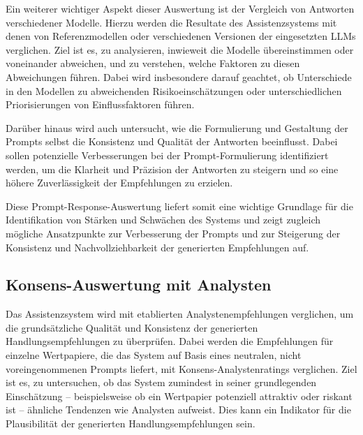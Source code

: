       Ein weiterer wichtiger Aspekt dieser Auswertung ist der Vergleich von Antworten verschiedener Modelle.
      Hierzu werden die Resultate des Assistenzsystems mit denen von Referenzmodellen oder verschiedenen Versionen der eingesetzten \acs{LLM}s verglichen.
      Ziel ist es, zu analysieren, inwieweit die Modelle übereinstimmen oder voneinander abweichen, und zu verstehen, welche Faktoren zu diesen Abweichungen führen.
      Dabei wird insbesondere darauf geachtet, ob Unterschiede in den Modellen zu abweichenden Risikoeinschätzungen oder unterschiedlichen Priorisierungen von Einflussfaktoren führen.

      Darüber hinaus wird auch untersucht, wie die Formulierung und Gestaltung der Prompts selbst die Konsistenz und Qualität der Antworten beeinflusst.
      Dabei sollen potenzielle Verbesserungen bei der Prompt-Formulierung identifiziert werden, um die Klarheit und Präzision der Antworten zu steigern und so eine höhere Zuverlässigkeit der Empfehlungen zu erzielen.

      Diese Prompt-Response-Auswertung liefert somit eine wichtige Grundlage für die Identifikation von Stärken und Schwächen des Systems und zeigt zugleich mögliche Ansatzpunkte zur Verbesserung der Prompts und zur Steigerung der Konsistenz und Nachvollziehbarkeit der generierten Empfehlungen auf.



    \subsection{Konsens-Auswertung mit Analysten}
      \label{sec:analyst-konsens}

      Das Assistenzsystem wird mit etablierten Analystenempfehlungen verglichen, um die grundsätzliche Qualität und Konsistenz der generierten Handlungsempfehlungen zu überprüfen.
      Dabei werden die Empfehlungen für einzelne Wertpapiere, die das System auf Basis eines neutralen, nicht voreingenommenen Prompts liefert, mit Konsens-Analystenratings verglichen.
      Ziel ist es, zu untersuchen, ob das System zumindest in seiner grundlegenden Einschätzung -- beispielsweise ob ein Wertpapier potenziell attraktiv oder riskant ist -- ähnliche Tendenzen wie Analysten aufweist.
      Dies kann ein Indikator für die Plausibilität der generierten Handlungsempfehlungen sein.

